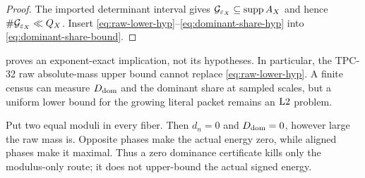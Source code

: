 \begin{proof}
The imported determinant interval gives
\(\mathcal G_{\varepsilon_X}\subseteq\operatorname{supp} A_X\) and hence
\(\#\mathcal G_{\varepsilon_X}\ll Q_X\).  Insert
\eqref{eq:raw-lower-hyp}--\eqref{eq:dominant-share-hyp} into
\eqref{eq:dominant-share-bound}.
\end{proof}

\begin{remark}
 proves an exponent-exact implication, not
its hypotheses.  In particular, the TPC-32 raw absolute-mass upper
bound cannot replace \eqref{eq:raw-lower-hyp}.  A finite census can
measure \(D_{\mathrm{dom}}\) and the dominant share at sampled scales, but a
uniform lower bound for the growing literal packet remains an
\(\mathrm{L2}\) problem.
\end{remark}

\begin{example}
\label{ex:balanced-fibers}
Put two equal moduli in every fiber.  Then \(d_n=0\) and
\(D_{\mathrm{dom}}=0\), however large the raw mass is.  Opposite phases make
the actual energy zero, while aligned phases make it maximal.  Thus a
zero dominance certificate kills only the modulus-only route; it does
not upper-bound the actual signed energy.
\end{example}
